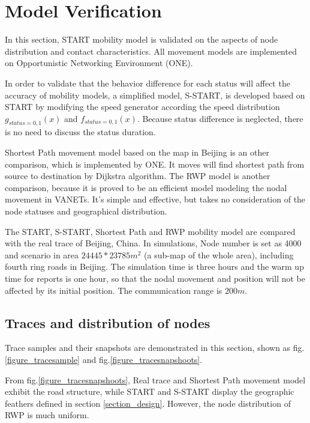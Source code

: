\section{Model Verification}
\label{section_model_varification}
In this section, START mobility model is validated on the aspects of node distribution and contact characteristics. All movement models are implemented on Opportunistic Networking Environment (ONE)\cite{KeranenOtt-155}.

In order to  validate that the behavior difference for each status will affect the accuracy of mobility models, a simplified model, S-START, is developed based on START by modifying the speed generator according the speed distribution $g_{status=0,1}(x)$ and $f_{status=0,1}(x)$. Because status difference is neglected, there is no need to discuss the status duration.

Shortest Path movement model based on the map in Beijing is an other comparison, which is implemented by ONE.  It moves will find shortest path from source to destination by Dijkstra algorithm.
 The RWP model is another comparison, because it is proved to be an efficient model modeling the nodal movement in VANETs. It's simple and effective, but takes no consideration of the node statuses and geographical distribution.

The START, S-START, Shortest Path and RWP mobility model are compared with the real trace of Beijing, China.
In simulations, Node number is set as 4000 and scenario in area $24445*23785 m^2$ (a sub-map of the whole area), including fourth ring roads in Beijing. The simulation time is three hours and the warm up time for reports is one hour, so that the nodal movement and position will not be affected by its initial position. The communication range is $200m$.

\subsection{Traces and distribution of nodes}

Trace samples and their snapshots are demonstrated in this section, shown as fig. \ref{figure_tracesample} and fig.\ref{figure_tracesnapshoots}.

From fig.\ref{figure_tracesnapshoots}, Real trace and Shortest Path movement model exhibit the road structure, while START and S-START display the geographic feathers defined in section \ref{section_design}. However, the node distribution of RWP is much uniform.

